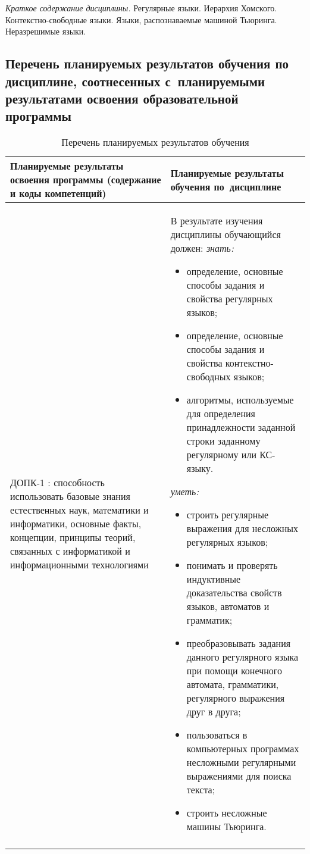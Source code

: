\documentclass[a4paper,12pt]{article}
\begin{document}
  
  \textit{Краткое содержание дисциплины.} Регулярные языки. Иерархия Хомского. Контекстно-свободные языки. Языки, распознаваемые машиной Тьюринга. Неразрешимые языки.
  
  



\subsection{Перечень планируемых результатов обучения по дисциплине, соотнесенных с~планируемыми результатами освоения образовательной программы}

\begin{longtable}{|p{54mm}|p{100mm}|}
  \caption{Перечень планируемых результатов обучения}\\
  \hline
  \centering
  Планируемые результаты освоения программы (содержание и коды компетенций) & 
  \centering\arraybackslash
  Планируемые результаты обучения по~дисциплине
  \\
  \hline
  
  ДОПК-1 : способность использовать базовые знания естественных наук, математики и информатики, основные факты, концепции, принципы теорий, связанных с информатикой и информационными технологиями
  & 
  В результате изучения дисциплины обучающийся должен:\newline
  \emph{знать:}
  \begin{itemize}[leftmargin=12pt]
    \item определение, основные способы задания и свойства регулярных языков; 
    \item определение, основные способы задания и свойства контекстно-свободных языков; 
    \item алгоритмы, используемые для определения принадлежности заданной строки заданному регулярному или КС-языку. 
  \end{itemize}
  

  \emph{уметь:}
  \begin{itemize}[leftmargin=12pt]
    \item строить регулярные выражения для несложных регулярных языков; 
    \item понимать и проверять индуктивные доказательства свойств языков, автоматов и грамматик; 
    \item преобразовывать задания данного регулярного языка при помощи конечного автомата, грамматики, регулярного выражения друг в друга; 
    \item пользоваться в компьютерных программах несложными регулярными выражениями для поиска текста; 
    \item строить несложные машины Тьюринга. 
  \end{itemize}
\\
\hline
&  


\end{longtable}
\end{document}
